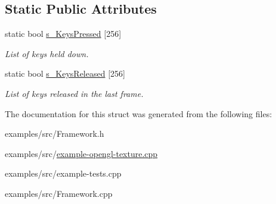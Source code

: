 \subsection*{Static Public Attributes}
\begin{DoxyCompactItemize}
\item 
\hypertarget{struct_t_i_l_f_w_a5f1cf50ed4d2be6b021fe269c02bd22e}{
static bool \hyperlink{struct_t_i_l_f_w_a5f1cf50ed4d2be6b021fe269c02bd22e}{s\_\-KeysPressed} \mbox{[}256\mbox{]}}
\label{struct_t_i_l_f_w_a5f1cf50ed4d2be6b021fe269c02bd22e}

\begin{DoxyCompactList}\small\item\em List of keys held down. \item\end{DoxyCompactList}\item 
\hypertarget{struct_t_i_l_f_w_afa69bc2e40bd4ad9ab8b1fa325256949}{
static bool \hyperlink{struct_t_i_l_f_w_afa69bc2e40bd4ad9ab8b1fa325256949}{s\_\-KeysReleased} \mbox{[}256\mbox{]}}
\label{struct_t_i_l_f_w_afa69bc2e40bd4ad9ab8b1fa325256949}

\begin{DoxyCompactList}\small\item\em List of keys released in the last frame. \item\end{DoxyCompactList}\end{DoxyCompactItemize}


The documentation for this struct was generated from the following files:\begin{DoxyCompactItemize}
\item 
examples/src/Framework.h\item 
examples/src/\hyperlink{example-opengl-texture_8cpp}{example-\/opengl-\/texture.cpp}\item 
examples/src/example-\/tests.cpp\item 
examples/src/Framework.cpp\end{DoxyCompactItemize}
